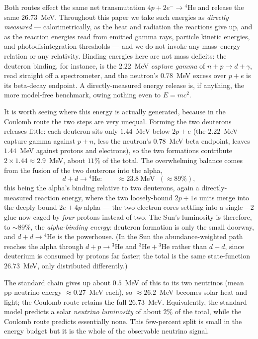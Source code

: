 \documentclass[11pt]{article}
\begin{document}
Both routes effect the same net transmutation $4p+2e^-\to{}^4\mathrm{He}$ and release the same
$26.73$~MeV. Throughout this paper we take such energies as \emph{directly measured} --- calorimetrically,
as the heat and radiation the reactions give up, and as the reaction energies read from emitted gamma
rays, particle kinetic energies, and photodisintegration thresholds --- and we do not invoke any
mass--energy relation or any relativity. Binding energies here are not mass deficits: the deuteron
binding, for instance, is the $2.22$~MeV \emph{capture gamma} of $n+p\to d+\gamma$, read straight off a
spectrometer, and the neutron's $0.78$~MeV excess over $p+e$ is its beta-decay endpoint. A
directly-measured energy release is, if anything, the more model-free benchmark, owing nothing even to
$E=mc^2$.

It is worth seeing where this energy is actually generated, because in the Coulomb route the two steps
are very unequal. Forming the two deuterons releases little: each deuteron sits only $1.44$~MeV below
$2p+e$ (the $2.22$~MeV capture gamma against $p+n$, less the neutron's $0.78$~MeV beta endpoint, leaves
$1.44$~MeV against protons and electrons), so the two formations contribute $2\times1.44\approx2.9$~MeV,
about $11\%$ of the total. The overwhelming balance comes from the fusion of the two deuterons into the
alpha,
\begin{equation}
d + d \to {}^4\mathrm{He}: \qquad \approx 23.8~\text{MeV} \;\; (\approx 89\%),
\end{equation}
this being the alpha's binding relative to two deuterons, again a directly-measured reaction energy,
where the two loosely-bound $2p+1e$ units merge into the deeply-bound $2e+4p$ alpha --- the two electron
cores settling into a single $-2$ glue now caged by \emph{four} protons instead of two. The Sun's
luminosity is therefore, to $\sim\!89\%$, the \emph{alpha-binding energy}: deuteron formation is only
the small doorway, and $d+d\to{}^4\mathrm{He}$ is the powerhouse. (In the Sun the abundance-weighted
path reaches the alpha through $d+p\to{}^3\mathrm{He}$ and ${}^3\mathrm{He}+{}^3\mathrm{He}$ rather than
$d+d$, since deuterium is consumed by protons far faster; the total is the same state-function
$26.73$~MeV, only distributed differently.)

The standard chain gives up about $0.5$~MeV of this to its two neutrinos (mean pp-neutrino energy
$\approx 0.27$~MeV each), so $\approx 26.2$~MeV becomes solar heat and light; the Coulomb route retains
the full $26.73$~MeV. Equivalently, the standard model predicts a solar \emph{neutrino luminosity} of
about $2\%$ of the total, while the Coulomb route predicts essentially none. This few-percent split is
small in the energy budget but it is the whole of the observable neutrino signal.
\end{document}
